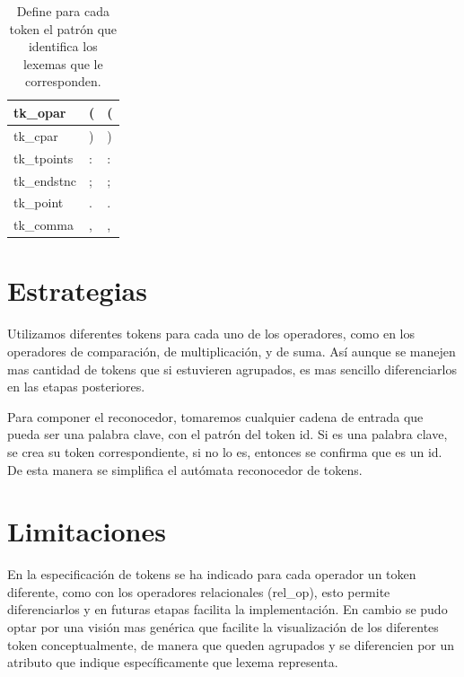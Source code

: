 \begin{table}[H]
\begin{tabular}{|l|l|l|}
tk\_opar      & (                                                    & (                    \\ \hline
tk\_cpar      & )                                                    & )                    \\ \hline
tk\_tpoints   & :                                                    & :                    \\ \hline
tk\_endstnc   & ;                                                    & ;                    \\ \hline
tk\_point     & .                                                    & .                    \\ \hline
tk\_comma     & ,                                                    & ,                    \\ \hline
\end{tabular}
\caption{Define para cada token el patrón que identifica los lexemas que le corresponden.}
\label{tab:tabla_token}
\end{table}

\section{Estrategias}
Utilizamos diferentes tokens para cada uno de los operadores, como en los operadores de comparación, de multiplicación, y de suma. Así aunque se manejen mas cantidad de tokens que si estuvieren agrupados, es mas sencillo diferenciarlos en las etapas posteriores.

Para componer el reconocedor, tomaremos cualquier cadena de entrada que pueda ser una palabra clave, con el patrón del token id. Si es una palabra clave, se crea su token correspondiente, si no lo es, entonces se confirma que es un id. De esta manera se simplifica el autómata reconocedor de tokens.

\section{Limitaciones}
\label{sec:lexico_limitaciones}
En la especificación de tokens se ha indicado para cada operador un token diferente, como con los operadores relacionales (rel\_op), esto permite diferenciarlos y en futuras etapas facilita la implementación. En cambio se pudo optar por una visión mas genérica que facilite la visualización de los diferentes token conceptualmente, de manera que queden agrupados y se diferencien por un atributo que indique específicamente que lexema representa.

